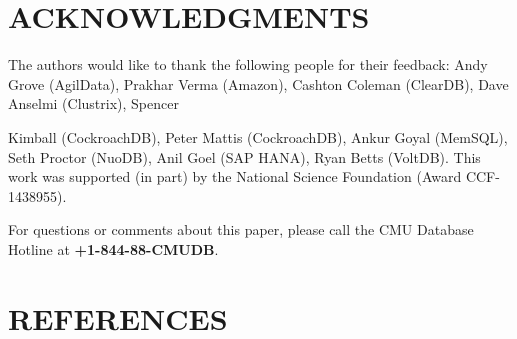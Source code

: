 \documentclass[a4paper,11pt,twoside,openright]{article}
\begin{document}
\hypertarget{acknowledgments}{%
\section{ACKNOWLEDGMENTS}\label{acknowledgments}}

The authors would like to thank the following people for their feedback:
Andy Grove (AgilData), Prakhar Verma (Amazon), Cashton Coleman
(ClearDB), Dave Anselmi (Clustrix), Spencer

Kimball (CockroachDB), Peter Mattis (CockroachDB), Ankur Goyal (MemSQL),
Seth Proctor (NuoDB), Anil Goel (SAP HANA), Ryan Betts (VoltDB). This
work was supported (in part) by the National Science Foundation (Award
CCF-1438955).

For questions or comments about this paper, please call the CMU Database
Hotline at \textbf{+1-844-88-CMUDB}.

\hypertarget{references}{%
\section{REFERENCES}\label{references}}
\end{document}
